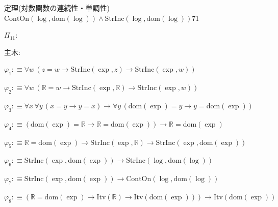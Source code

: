 \begin{fullproof}{定理(対数関数の連続性・単調性)}{$\mathrm{ContOn}(\log,\mathrm{dom}(\log)) \land \mathrm{StrInc}(\log,\mathrm{dom}(\log))$}{71}
\begin{ptree}
\end{ptree}
\noindent$\Pi_{11}$:
\begin{ptree}
\noLine
{}
\noLine
{}
\noLine
{}
\end{ptree}
\noindent 主木:
\begin{ptree}
\noLine
{}
\noLine
{}
\noLine
{}
\end{ptree}
\begin{abbrevlist}
\item $\varphi_{1} :\equiv \forall w\,(z = w \to \mathrm{StrInc}(\exp,z) \to \mathrm{StrInc}(\exp,w))$
\item $\varphi_{2} :\equiv \forall w\,(\mathbb{R} = w \to \mathrm{StrInc}(\exp,\mathbb{R}) \to \mathrm{StrInc}(\exp,w))$
\item $\varphi_{3} :\equiv \forall x\,\forall y\,(x = y \to y = x) \to \forall y\,(\mathrm{dom}(\exp) = y \to y = \mathrm{dom}(\exp))$
\item $\varphi_{4} :\equiv (\mathrm{dom}(\exp) = \mathbb{R} \to \mathbb{R} = \mathrm{dom}(\exp)) \to \mathbb{R} = \mathrm{dom}(\exp)$
\item $\varphi_{5} :\equiv \mathbb{R} = \mathrm{dom}(\exp) \to \mathrm{StrInc}(\exp,\mathbb{R}) \to \mathrm{StrInc}(\exp,\mathrm{dom}(\exp))$
\item $\varphi_{6} :\equiv \mathrm{StrInc}(\exp,\mathrm{dom}(\exp)) \to \mathrm{StrInc}(\log,\mathrm{dom}(\log))$
\item $\varphi_{7} :\equiv \mathrm{StrInc}(\exp,\mathrm{dom}(\exp)) \to \mathrm{ContOn}(\log,\mathrm{dom}(\log))$
\item $\varphi_{8} :\equiv (\mathbb{R} = \mathrm{dom}(\exp) \to \mathrm{Itv}(\mathbb{R}) \to \mathrm{Itv}(\mathrm{dom}(\exp))) \to \mathrm{Itv}(\mathrm{dom}(\exp))$

\end{abbrevlist}
\end{fullproof}
